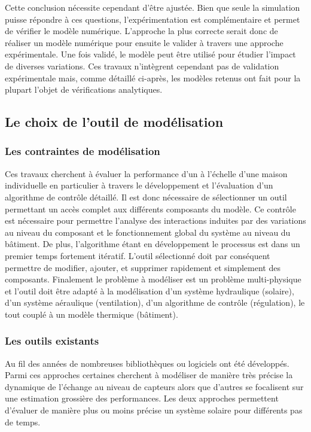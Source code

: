 Cette conclusion nécessite cependant d’être ajustée. Bien que seule la simulation puisse
répondre à ces questions, l’expérimentation est complémentaire et permet de vérifier le
modèle numérique. L’approche la plus correcte serait donc de réaliser un modèle numérique
pour ensuite le valider à travers une approche expérimentale. Une fois validé, le modèle
peut être utilisé pour étudier l’impact de diverses variations. Ces travaux n’intègrent
cependant pas de validation expérimentale mais, comme détaillé ci-après, les modèles
retenus ont fait pour la plupart l’objet de vérifications analytiques.


\subsection{Le choix de l’outil de modélisation} %
\label{sub:le_choix_de_l_outil_de_modelisation}
\subsubsection{Les contraintes de modélisation} %
\label{ssub:les_contraintes_de_modelisation}
Ces travaux cherchent à évaluer la performance d’un  à l’échelle d’une maison
individuelle en particulier à travers le développement et l’évaluation d’un algorithme de
contrôle détaillé. Il est donc nécessaire de sélectionner un outil permettant un accès
complet aux différents composants du modèle. Ce contrôle est nécessaire pour permettre
l’analyse des interactions induites par des variations au niveau du composant et le
fonctionnement global du système au niveau du bâtiment. De plus, l’algorithme étant en
développement le processus est dans un premier temps fortement itératif. L’outil
sélectionné doit par conséquent permettre de modifier, ajouter, et supprimer rapidement et
simplement des composants. Finalement le problème à modéliser est un problème multi-physique
et l’outil doit être adapté à la modélisation d’un système hydraulique (solaire),
d’un système aéraulique (ventilation), d’un algorithme de contrôle (régulation), le tout
couplé à un modèle thermique (bâtiment).


\subsubsection{Les outils existants} %
\label{ssub:les_outils_existants}
Au fil des années de nombreuses bibliothèques ou logiciels ont été développés. Parmi ces
approches certaines cherchent à modéliser de manière très précise la dynamique de
l’échange au niveau de capteurs alors que d’autres se focalisent sur une estimation
grossière des performances. Les deux approches permettent d’évaluer de manière plus ou
moins précise un système solaire pour différents pas de temps.

